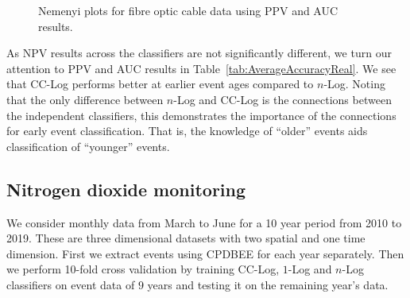 \documentclass[a4paper,11pt]{article}
\begin{document}
\begin{figure}[!htb]
	\centering
	\caption{Nemenyi plots for fibre optic cable data using PPV and AUC results.}
  \label{fig:FibreNemenyi}
\end{figure}

As NPV results across the classifiers are not significantly different, we turn our attention to PPV and AUC results in Table~\ref{tab:AverageAccuracyReal}. We see that CC-Log performs better at earlier event ages compared to $n$-Log. Noting that the only difference between $n$-Log and CC-Log is the connections between the independent classifiers, this demonstrates the importance of the connections for early event classification. That is, the knowledge of ``older'' events aids classification of ``younger'' events.

\subsection{Nitrogen dioxide monitoring}\label{sec:NO2Exp}

We consider  monthly   data from March to June for a 10 year period from 2010 to 2019. These are three dimensional datasets with two spatial and one time dimension. First we extract events using CPDBEE for each year separately. Then we perform 10-fold cross validation by training CC-Log, $1$-Log and $n$-Log classifiers on event data of $9$ years and testing it on the remaining year's data.
\end{document}
